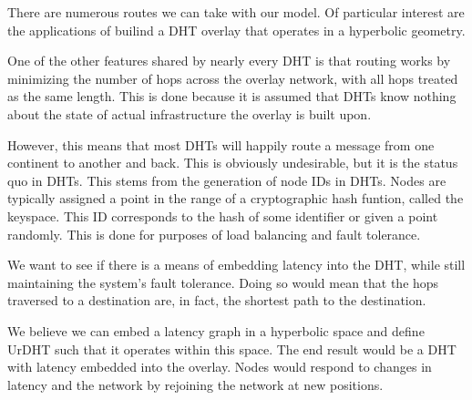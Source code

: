 \documentclass[11pt,conference]{IEEEtran}
\begin{document}
There are numerous routes we can take with our model.
Of particular interest are the applications of builind a DHT overlay that operates in a hyperbolic geometry.

One of the other features shared by nearly every DHT is that routing works by minimizing the number of hops across the overlay network, with all hops treated as the same length.
This is done because it is assumed that DHTs know nothing about the state of actual infrastructure the overlay is built upon.

However, this means that most DHTs will happily route a message from one continent to another and back.
This is obviously undesirable, but it is the status quo in DHTs.
This stems from the generation of node IDs in DHTs. 
Nodes are typically assigned a point in the range of a cryptographic hash funtion, called the keyspace. 
This ID corresponds to the hash of some identifier or given a point randomly.
This is done for purposes of load balancing and fault tolerance.

We want to see if there is a means of embedding latency into the DHT, while still maintaining the system's fault tolerance.
Doing so would mean that the hops traversed to a destination are, in fact, the shortest path to the destination.

We believe we can embed a latency graph in a hyperbolic space and define UrDHT such that it operates within this space.
The end result would be a DHT with latency embedded into the overlay.
Nodes would respond to changes in latency and the network by rejoining the network at new positions.






\end{document}
